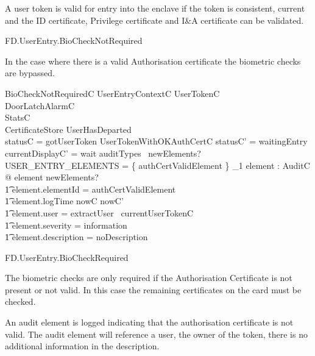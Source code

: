 A user token is valid for entry into the enclave if the token is
consistent, current and the ID
certificate, Privilege certificate and I\&A certificate can be validated.

\begin{traceunit}{FD.UserEntry.BioCheckNotRequired}
\end{traceunit}

In the case where there is a
valid Authorisation certificate the biometric checks are bypassed.

\begin{schema}{BioCheckNotRequiredC}
        UserEntryContextC
\also
        \Xi UserTokenC
\\      \Xi DoorLatchAlarmC        
\\      \Xi StatsC
\\      \Xi CertificateStore
\where
        \lnot UserHasDeparted
\\      statusC = gotUserToken
\also
        UserTokenWithOKAuthCertC
\also
        statusC' = waitingEntry
\\      currentDisplayC' = wait
\also
        auditTypes~ newElements? \cap USER\_ENTRY\_ELEMENTS = 
        \{ authCertValidElement \} 
\also
        \exists_1 element : AuditC @ element \in newElements? 
\\ \t1  \land element.elementId = authCertValidElement
\\ \t1  \land element.logTime \in nowC \upto nowC'
\\ \t1  \land element.user = extractUser~ currentUserTokenC
\\ \t1  \land element.severity = information
\\ \t1  \land element.description = noDescription
\end{schema}

\begin{traceunit}{FD.UserEntry.BioCheckRequired}
\end{traceunit}


The biometric checks are only required if the Authorisation
Certificate is not present or not valid. In this case the remaining
certificates on the card must be checked.

An audit element is logged indicating that the authorisation
certificate is not valid.
The audit element will reference a user, the owner of the token, there is
no additional information in the description. 

